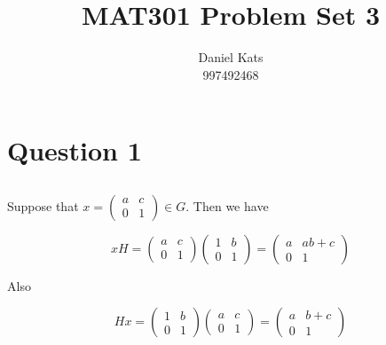 \documentclass[a4paper,12pt]{article}
\numberwithin{equation}{section}
\begin{document}
\begin{titlepage}
\title{MAT301 Problem Set 3}
\author{Daniel Kats \\ 997492468}
\clearpage
\maketitle
\thispagestyle{empty}
\end{titlepage}

\section{Question 1}

\subsection{}

Suppose that $x = \left( \begin{array}{cc}
a & c \\
0 & 1 \end{array} \right) \in G$. Then we have

\begin{equation}\label{1a:xH}
xH = \left( \begin{array}{cc}
a & c \\
0 & 1 \end{array} \right)\left( \begin{array}{cc}
1 & b \\
0 & 1 \end{array} \right) = 
\left( \begin{array}{cc}
a & ab + c\\
0 & 1
\end{array} \right)
\end{equation}

Also

\begin{equation}\label{1a:Hx}
Hx = \left( \begin{array}{cc}
1 & b \\
0 & 1 \end{array} \right)\left( \begin{array}{cc}
a & c \\
0 & 1 \end{array} \right) = 
\left( \begin{array}{cc}
a & b + c\\
0 & 1
\end{array} \right)
\end{equation}
\end{document}
